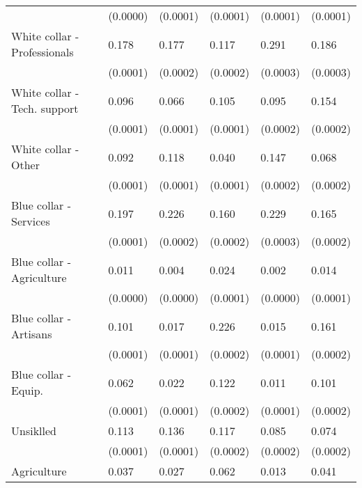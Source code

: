 \begin{tabular}{llllll}
                             &  (0.0000) &  (0.0001) &  (0.0001) &           (0.0001) &         (0.0001) \\
White collar - Professionals &     0.178 &     0.177 &     0.117 &              0.291 &            0.186 \\
                             &  (0.0001) &  (0.0002) &  (0.0002) &           (0.0003) &         (0.0003) \\
White collar - Tech. support &     0.096 &     0.066 &     0.105 &              0.095 &            0.154 \\
                             &  (0.0001) &  (0.0001) &  (0.0001) &           (0.0002) &         (0.0002) \\
White collar - Other         &     0.092 &     0.118 &     0.040 &              0.147 &            0.068 \\
                             &  (0.0001) &  (0.0001) &  (0.0001) &           (0.0002) &         (0.0002) \\
Blue collar - Services       &     0.197 &     0.226 &     0.160 &              0.229 &            0.165 \\
                             &  (0.0001) &  (0.0002) &  (0.0002) &           (0.0003) &         (0.0002) \\
Blue collar - Agriculture    &     0.011 &     0.004 &     0.024 &              0.002 &            0.014 \\
                             &  (0.0000) &  (0.0000) &  (0.0001) &           (0.0000) &         (0.0001) \\
Blue collar - Artisans       &     0.101 &     0.017 &     0.226 &              0.015 &            0.161 \\
                             &  (0.0001) &  (0.0001) &  (0.0002) &           (0.0001) &         (0.0002) \\
Blue collar - Equip.         &     0.062 &     0.022 &     0.122 &              0.011 &            0.101 \\
                             &  (0.0001) &  (0.0001) &  (0.0002) &           (0.0001) &         (0.0002) \\
Unsiklled                    &     0.113 &     0.136 &     0.117 &              0.085 &            0.074 \\
                             &  (0.0001) &  (0.0001) &  (0.0002) &           (0.0002) &         (0.0002) \\
Agriculture                  &     0.037 &     0.027 &     0.062 &              0.013 &            0.041 \\

\end{tabular}
